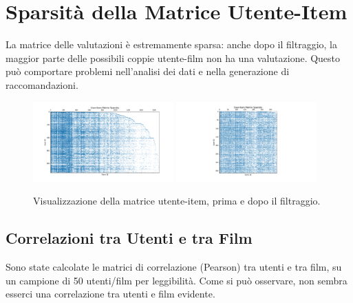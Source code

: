 \section{Sparsità della Matrice Utente-Item}
La matrice delle valutazioni è estremamente sparsa: anche dopo il filtraggio, la maggior parte delle possibili coppie utente-film non ha una valutazione. Questo può comportare problemi nell'analisi dei dati e nella generazione di raccomandazioni.

\begin{figure}[H]
    \centering
    \includegraphics[width=0.48\textwidth]{../output/eda/before_cut/before_sparsity_matrix.png}
    \includegraphics[width=0.48\textwidth]{../output/eda/after_cut/after_sparsity_matrix.png}
    \caption{Visualizzazione della matrice utente-item, prima e dopo il filtraggio.}
\end{figure}

\subsection{Correlazioni tra Utenti e tra Film}
Sono state calcolate le matrici di correlazione (Pearson) tra utenti e tra film, su un campione di 50 utenti/film per leggibilità. Come si può osservare, non sembra esserci una correlazione tra utenti e film evidente.

